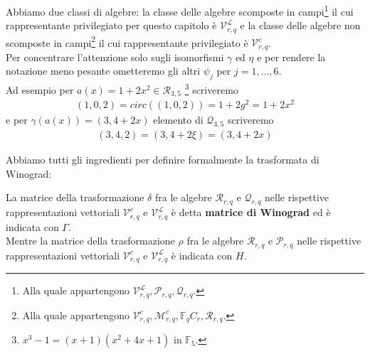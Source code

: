 Abbiamo due classi di algebre: la classe delle algebre scomposte in campi\footnote{Alla quale appartengono $\mathcal{V}_{r,q}^{\mathscr{L}} , \mathcal{P}_{r,q} , \mathcal{Q}_{r,q}$.} il cui rappresentante privilegiato per questo capitolo è $\mathcal{V}_{r,q}^{\mathscr{L}} $ e la classe delle algebre non scomposte in campi\footnote{Alla quale appartengono $\mathcal{V}_{r,q}^{c}  , \mathcal{M}_{r,q }^{c}, \mathbb{F}_{q}C_{r}, \mathcal{R}_{r,q} $.} il cui rappresentante privilegiato è  $\mathcal{V}_{r,q}^{c} $.
\\
Per concentrare l'attenzione solo sugli isomorfismi $\gamma$ ed $\eta$ e per rendere la notazione meno pesante ometteremo gli altri $\psi_{j}$ per $j =1, \dots, 6 $.\\
Ad esempio per $a(x) =  1 + 2x^2 \in \mathcal{R}_{3,5} $ \footnote{$x^3-1 = (x+1)(x^2+4x+1)$ in $\mathbb{F}_{5}$.} scriveremo 
\begin{align*}
   (1,0,2) = circ((1,0,2)) = 1+2g^2 = 1 + 2x^2 
\end{align*}
e per $\gamma(a(x)) = (3, 4 + 2x )$ elemento di $\mathcal{Q}_{3,5}$ scriveremo
\begin{align*}
   (3,4,2)  = (3 , 4 + 2\xi) = (3 , 4 + 2x )
\end{align*}

Abbiamo tutti gli ingredienti per definire formalmente la trasformata di Winograd:
\begin{definizione}
   La matrice della trasformazione $\delta$ fra le algebre $\mathcal{R}_{r,q} $ e $ \mathcal{Q}_{r,q} $ nelle rispettive rappresentazioni vettoriali $ \mathcal{V}_{r, q}^{c} $ e $\mathcal{V}_{r,q}^{\mathscr{L}} $ è detta {\bf matrice di Winograd} ed è indicata con $\Gamma$.\\
   Mentre la matrice della trasformazione $\rho$ fra le algebre $\mathcal{R}_{r,q} $ e $ \mathcal{P}_{r,q} $ nelle rispettive rappresentazioni vettoriali $ \mathcal{V}_{r, q}^{c} $ e $\mathcal{V}_{r,q}^{\mathscr{L}} $ è indicata con $H$.
\end{definizione}


